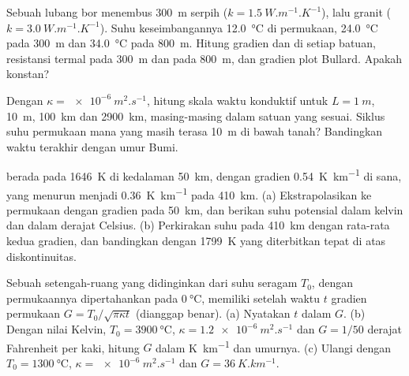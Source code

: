 \begin{exercise}[$\star\star$]\label{exo:b1:heat-budget:6}
Sebuah lubang bor menembus \qty{300}{m} serpih ($k = \qty{1.5}{W.m^{-1}.K^{-1}}$), lalu granit ($k = \qty{3.0}{W.m^{-1}.K^{-1}}$). Suhu keseimbangannya \qty{12.0}{\degreeCelsius} di permukaan, \qty{24.0}{\degreeCelsius} pada \qty{300}{m} dan \qty{34.0}{\degreeCelsius} pada \qty{800}{m}. Hitung gradien dan  di setiap batuan, resistansi termal pada \qty{300}{m} dan pada \qty{800}{m}, dan gradien plot Bullard. Apakah  konstan?
\end{exercise}

\begin{exercise}[$\star\star$]\label{exo:b1:heat-budget:7}
Dengan $\kappa = \qty{e-6}{m^2.s^{-1}}$, hitung skala waktu konduktif untuk $L = \qty{1}{m}$, \qty{10}{m}, \qty{100}{km} dan \qty{2900}{km}, masing-masing dalam satuan yang sesuai. Siklus suhu permukaan mana yang masih terasa \qty{10}{m} di bawah tanah? Bandingkan waktu terakhir dengan umur Bumi.
\end{exercise}

\begin{exercise}[$\star\star$]\label{exo:b1:heat-budget:8}
 berada pada \qty{1646}{K} di kedalaman \qty{50}{km}, dengan gradien \qty{0.54}{K.km^{-1}} di sana, yang menurun menjadi \qty{0.36}{K.km^{-1}} pada \qty{410}{km}. (a) Ekstrapolasikan ke permukaan dengan gradien pada \qty{50}{km}, dan berikan suhu potensial dalam kelvin dan dalam derajat Celsius. (b) Perkirakan suhu pada \qty{410}{km} dengan rata-rata kedua gradien, dan bandingkan dengan \qty{1799}{K} yang diterbitkan tepat di atas diskontinuitas.
\end{exercise}

\begin{exercise}[$\star\star$]\label{exo:b1:heat-budget:9}
Sebuah setengah-ruang yang didinginkan dari suhu seragam $T_0$, dengan permukaannya dipertahankan pada $\qty{0}{\degreeCelsius}$, memiliki setelah waktu $t$ gradien permukaan $G =
T_0/\sqrt{\pi\kappa t}$ (dianggap benar). (a) Nyatakan $t$ dalam $G$. (b) Dengan nilai Kelvin, $T_0 = \qty{3900}{\degreeCelsius}$, $\kappa =
\qty{1.2e-6}{m^2.s^{-1}}$ dan $G = 1/50$ derajat Fahrenheit per kaki, hitung $G$ dalam \unit{K.km^{-1}} dan umurnya. (c) Ulangi dengan $T_0 =
\qty{1300}{\degreeCelsius}$, $\kappa = \qty{e-6}{m^2.s^{-1}}$ dan $G =
\qty{36}{K.km^{-1}}$.
\end{exercise}

